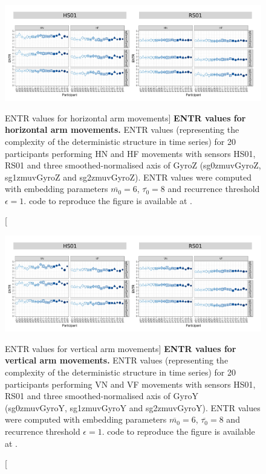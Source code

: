\begin{figure}
\centering
\includegraphics[width=1.0\textwidth]{entr_aH}
    \caption
	[ENTR values for horizontal arm movements]{
	{\bf ENTR values for horizontal arm movements.}
    	ENTR values (representing the complexity of the deterministic 
	structure in time series) for 
	20 participants performing HN and HF movements
	with sensors HS01, RS01 and three smoothed-normalised axis 
	of GyroZ (sg0zmuvGyroZ, sg1zmuvGyroZ and sg2zmuvGyroZ).
	ENTR values were computed with 
	embedding parameters $\overline{m_0}=6$, $\overline{\tau_0}=8$ and
	recurrence threshold $\epsilon=1$.
	\R code to reproduce the figure is available at 
	.
        }
    \label{fig:entr_aH}
\end{figure}
\begin{figure}
\centering
\includegraphics[width=1.0\textwidth]{entr_aV}
    \caption
	[ENTR values for vertical arm movements]{
	{\bf ENTR values for vertical arm movements.}
    	ENTR values (representing the complexity of the deterministic 
	structure in time series) for 
	20 participants performing VN and VF movements
	with sensors HS01, RS01 and three smoothed-normalised axis 
	of GyroY (sg0zmuvGyroY, sg1zmuvGyroY and sg2zmuvGyroY).
	ENTR values were computed with 
	embedding parameters $\overline{m_0}=6$, $\overline{\tau_0}=8$ and
	recurrence threshold $\epsilon=1$.
	\R code to reproduce the figure is available at 
	.
        }
    \label{fig:entr_aV}
\end{figure}





